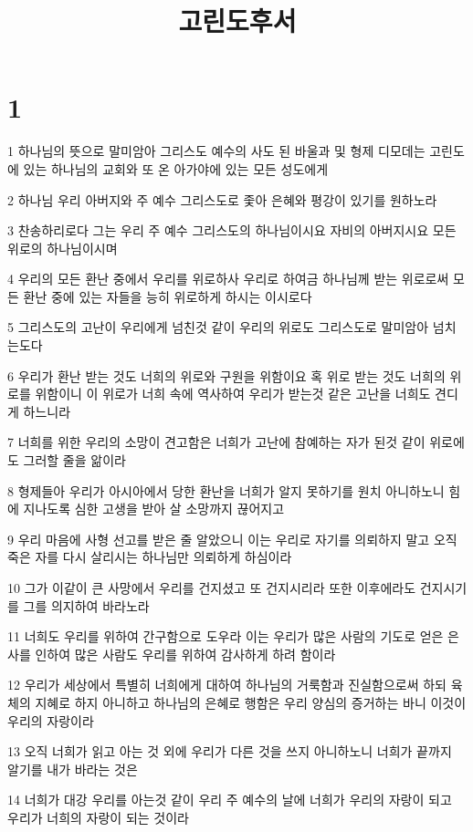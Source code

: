 

\title{고린도후서}


\chapter{1}

\par 1 하나님의 뜻으로 말미암아 그리스도 예수의 사도 된 바울과 및 형제 디모데는 고린도에 있는 하나님의 교회와 또 온 아가야에 있는 모든 성도에게
\par 2 하나님 우리 아버지와 주 예수 그리스도로 좇아 은혜와 평강이 있기를 원하노라
\par 3 찬송하리로다 그는 우리 주 예수 그리스도의 하나님이시요 자비의 아버지시요 모든 위로의 하나님이시며
\par 4 우리의 모든 환난 중에서 우리를 위로하사 우리로 하여금 하나님께 받는 위로로써 모든 환난 중에 있는 자들을 능히 위로하게 하시는 이시로다
\par 5 그리스도의 고난이 우리에게 넘친것 같이 우리의 위로도 그리스도로 말미암아 넘치는도다
\par 6 우리가 환난 받는 것도 너희의 위로와 구원을 위함이요 혹 위로 받는 것도 너희의 위로를 위함이니 이 위로가 너희 속에 역사하여 우리가 받는것 같은 고난을 너희도 견디게 하느니라
\par 7 너희를 위한 우리의 소망이 견고함은 너희가 고난에 참예하는 자가 된것 같이 위로에도 그러할 줄을 앎이라
\par 8 형제들아 우리가 아시아에서 당한 환난을 너희가 알지 못하기를 원치 아니하노니 힘에 지나도록 심한 고생을 받아 살 소망까지 끊어지고
\par 9 우리 마음에 사형 선고를 받은 줄 알았으니 이는 우리로 자기를 의뢰하지 말고 오직 죽은 자를 다시 살리시는 하나님만 의뢰하게 하심이라
\par 10 그가 이같이 큰 사망에서 우리를 건지셨고 또 건지시리라 또한 이후에라도 건지시기를 그를 의지하여 바라노라
\par 11 너희도 우리를 위하여 간구함으로 도우라 이는 우리가 많은 사람의 기도로 얻은 은사를 인하여 많은 사람도 우리를 위하여 감사하게 하려 함이라
\par 12 우리가 세상에서 특별히 너희에게 대하여 하나님의 거룩함과 진실함으로써 하되 육체의 지혜로 하지 아니하고 하나님의 은혜로 행함은 우리 양심의 증거하는 바니 이것이 우리의 자랑이라
\par 13 오직 너희가 읽고 아는 것 외에 우리가 다른 것을 쓰지 아니하노니 너희가 끝까지 알기를 내가 바라는 것은
\par 14 너희가 대강 우리를 아는것 같이 우리 주 예수의 날에 너희가 우리의 자랑이 되고 우리가 너희의 자랑이 되는 것이라
